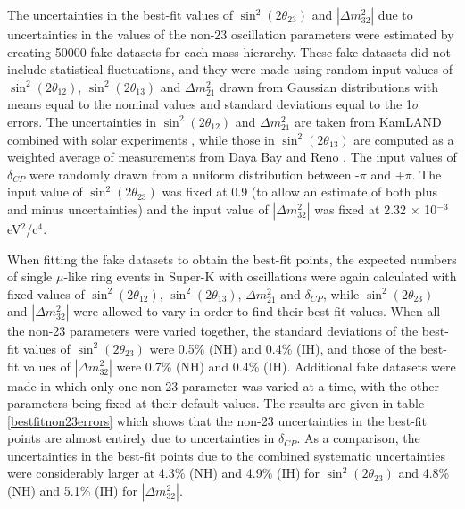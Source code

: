 The uncertainties in the best-fit values of $\sin^{2}(2 \theta_{23})$ and $|\Delta m_{32}^{2}|$ due to uncertainties in 
the values of the non-23 oscillation parameters were estimated by creating 50000 fake datasets for each mass 
hierarchy. These fake datasets did not include statistical fluctuations, and they were made using random input values of 
$\sin^{2}(2 \theta_{12})$, $\sin^{2}(2 \theta_{13})$ and $\Delta m_{21}^{2}$ drawn from Gaussian distributions with means 
equal to the nominal values and standard deviations equal to the 1$\sigma$ errors. The uncertainties in $\sin^{2}(2 \theta_{12})$ 
and $\Delta m_{21}^{2}$ are taken from KamLAND combined with solar experiments \cite{Kamland}, while those in 
$\sin^{2}(2 \theta_{13})$ are computed as a weighted average of measurements from Daya Bay \cite{DayaBay} and Reno \cite{Reno}. 
The input values of $\delta_{CP}$ were randomly drawn from a uniform distribution between -$\pi$ and +$\pi$. The input value of 
$\sin^{2}(2 \theta_{23})$ was fixed at 0.9 (to allow an estimate of both plus and minus uncertainties) and the input value of 
$|\Delta m_{32}^{2}|$ was fixed at 2.32 $\times$ 10$^{-3}$ eV$^{2}$/c$^{4}$. 

When fitting the fake datasets to obtain the best-fit points, the expected numbers of single $\mu$-like ring events in Super-K 
with oscillations were again calculated with fixed values of $\sin^{2}(2 \theta_{12})$, $\sin^{2}(2 \theta_{13})$, $\Delta m_{21}^{2}$ and $\delta_{CP}$, 
while $\sin^{2}(2 \theta_{23})$ and $|\Delta m_{32}^{2}|$ were allowed to vary in order to find their best-fit values. When all the non-23 
parameters were varied together, the standard deviations of the best-fit values of $\sin^{2}(2 \theta_{23})$ were 0.5\% (NH) and 0.4\% 
(IH), and those of the best-fit values of $|\Delta m_{32}^{2}|$ were 0.7\% (NH) and 0.4\% (IH). Additional fake datasets were made in which 
only one non-23 parameter was varied at a time, with the other parameters being fixed at their default values. The results are given in table 
\ref{bestfitnon23errors} which shows that the non-23 uncertainties in the best-fit points are almost entirely due to uncertainties in $\delta_{CP}$.
As a comparison, the uncertainties in the best-fit points due to the combined systematic uncertainties were considerably larger at 4.3\% (NH) 
and 4.9\% (IH) for $\sin^{2}(2 \theta_{23})$ and 4.8\% (NH) and 5.1\% (IH) for $|\Delta m_{32}^{2}|$. 

